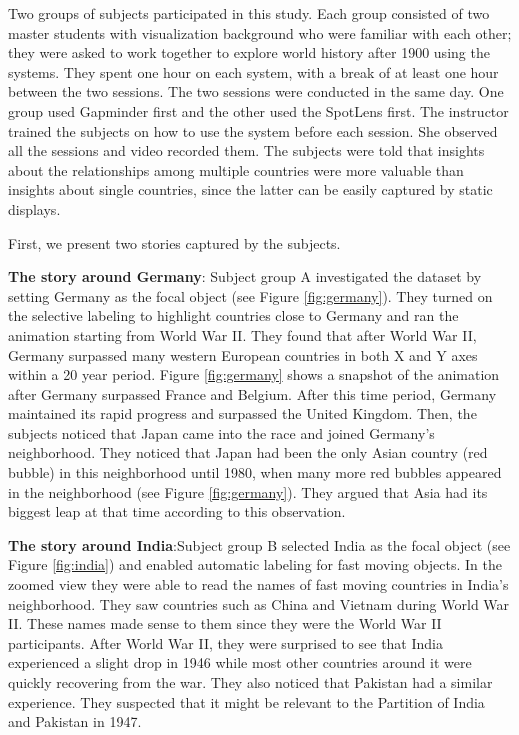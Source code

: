 \documentclass[review]{vgtc}                 %
\begin{document}
Two groups of subjects participated in this study. Each group consisted of two master students with visualization background who were familiar with each other; they were asked to work together to explore world history after 1900 using the systems. They spent one hour on each system, with a break of at least one hour between the two sessions. The two sessions were conducted in the same day. One group used Gapminder first and the other used the SpotLens first. The instructor trained the subjects on how to use the system before each session. She observed all the sessions and video recorded them. The subjects were told that insights about the relationships among multiple countries were more valuable than insights about single countries, since the latter can be easily captured by static displays.

First, we present two stories captured by the subjects.

{\bf The story around Germany}: Subject group A investigated the dataset by setting Germany as the focal object (see Figure \ref{fig:germany}). They turned on the selective labeling to highlight countries close to Germany and ran the animation starting from World War II. They found that after World War II, Germany surpassed many western European countries in both X and Y axes within a 20 year period. Figure \ref{fig:germany} shows a snapshot of the animation after Germany surpassed France and Belgium. After this time period, Germany maintained its rapid progress and surpassed the United Kingdom. Then, the subjects noticed that Japan came into the race and joined Germany's neighborhood. They noticed that Japan had been the only Asian country (red bubble) in this neighborhood until 1980, when many more red bubbles appeared in the neighborhood (see Figure \ref{fig:germany}). They argued that Asia had its biggest leap at that time according to this observation.

{\bf The story around India}:Subject group B selected India as the focal object (see Figure \ref{fig:india}) and enabled automatic labeling for fast moving objects. In the zoomed view they were able to read the names of fast moving countries in India's neighborhood. They saw countries such as China and Vietnam during World War II. These names made sense to them since they were the World War II participants. After World War II, they were surprised to see that India experienced a slight drop in 1946 while most other countries around it were quickly recovering from the war. They also noticed that Pakistan had a similar experience. They suspected that it might be relevant to the Partition of India and Pakistan in 1947.
\end{document}

